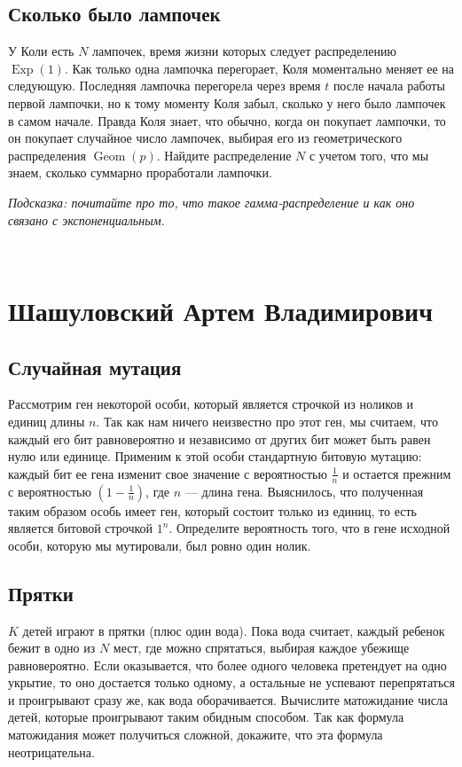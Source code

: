 \documentclass[12pt]{article}
\DeclareMathOperator{\Geom}{Geom}
\DeclareMathOperator{\Exp}{Exp}
\begin{document}
\subsection{Сколько было лампочек}
У Коли есть $N$ лампочек, время жизни которых следует распределению $\Exp(1)$. Как только одна лампочка перегорает, Коля моментально меняет ее на следующую. Последняя лампочка перегорела через время $t$ после начала работы первой лампочки, но к тому моменту Коля забыл, сколько у него было лампочек в самом начале. Правда Коля знает, что обычно, когда он покупает лампочки, то он покупает случайное число лампочек, выбирая его из геометрического распределения $\Geom(p)$. Найдите распределение $N$ с учетом того, что мы знаем, сколько суммарно проработали лампочки. 

\emph{Подсказка: почитайте про то, что такое гамма-распределение и как оно связано с экспоненциальным.}

\newpage
~
\newpage
\section{Шашуловский Артем Владимирович}

\subsection{Случайная мутация}
Рассмотрим ген некоторой особи, который является строчкой из ноликов и единиц длины $n$. Так как нам ничего неизвестно про этот ген, мы считаем, что каждый его бит равновероятно и независимо от других бит может быть равен нулю или единице. Применим к этой особи стандартную битовую мутацию: каждый бит ее гена изменит свое значение с вероятностью $\frac{1}{n}$ и остается прежним с вероятностью $(1 - \frac{1}{n})$, где $n$ --- длина гена. Выяснилось, что полученная таким образом особь имеет ген, который состоит только из единиц, то есть является битовой строчкой $1^n$. Определите вероятность того, что в гене исходной особи, которую мы мутировали, был ровно один нолик.

\subsection{Прятки}
$K$ детей играют в прятки (плюс один вода). Пока вода считает, каждый ребенок бежит в одно из $N$ мест, где можно спрятаться, выбирая каждое убежище равновероятно. Если оказывается, что более одного человека претендует на одно укрытие, то оно достается только одному, а остальные не успевают перепрятаться и проигрывают сразу же, как вода оборачивается. Вычислите матожидание числа детей, которые проигрывают таким обидным способом. Так как формула матожидания может получиться сложной, докажите, что эта формула неотрицательна.
\end{document}
